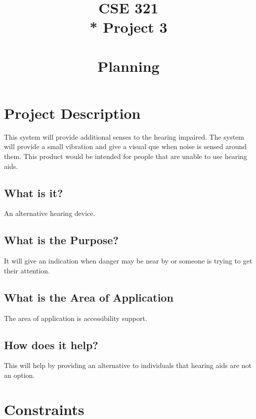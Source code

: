 \documentclass{article}
\title{\Huge{\textbf{CSE 321}  \\* Project 3 \\~\\ \textbf{Planning}}}
\date{} %
\begin{document}


\setcounter{secnumdepth}{-1}


\section{Project Description}
This system will provide additional senses to the hearing impaired.
The system will provide a small vibration and give a visual que
when noise is sensed around them.  This product would be intended
for people that are unable to use hearing aids.

\subsection{What is it?}
An alternative hearing device.

\subsection{What is the Purpose?}
It will give an indication when 
danger may be near by or someone is trying to get their attention.

\subsection{What is the Area of Application}
The area of application is accessibility support.

\subsection{How does it help?}
This will help by providing an alternative to individuals that hearing
aids are not an option.

\section{Constraints}
\end{document}

